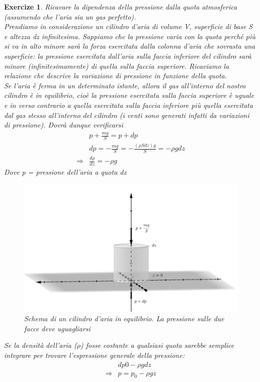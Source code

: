 \documentclass[10pt,a4paper]{article}
\newtheorem{exercize}{Exercize}
\begin{document}
\begin{exercize}
Ricavare la dipendenza della pressione dalla quota atmosferica (assumendo che l’aria sia un gas perfetto).\\
Prendiamo in considerazione un cilindro d'aria di volume V, superficie di base S e altezza dz infinitesima. Sappiamo che la pressione varia con la quota perché più si va in alto minore sarà la forza esercitata dalla colonna d'aria che sovrasta una superficie: la pressione esercitata dall'aria sulla faccia inferiore del cilindro sarà minore (infinitesimamente) di quella sulla faccia superiore. Ricaviamo la relazione che descrive la variazione di pressione in funzione della quota.\\
Se l'aria è ferma in un determinato istante, allora il gas all'interno del nostro cilindro è in equilibrio, cioè la pressione esercitata sulla faccia superiore è uguale e in verso contrario a quella esercitata sulla faccia inferiore più quella esercitata dal gas stesso all'interno del cilindro (i venti sono generati infatti da variazioni di pressione). Dovrà dunque verificarsi
\begin{align}\label{eq:stevin}
	&p + \frac{m g}{S} = p + dp \nonumber \\
	&dp = -\frac{m g}{S} = -\frac{(\rho S dz) g}{S}= -\rho g dz \nonumber \\
	\Rightarrow & \frac{d\rho}{dz}= - \rho g
\end{align}
Dove p = pressione dell'aria a quota dz
\begin{figure}[h!]
	\centering
	\includegraphics[width=0.5\linewidth]{cilindro_aria}
	\caption{Schema di un cilindro d'aria in equilibrio. La pressione sulle due facce deve uguagliarsi}
	\label{fig:cilindroaria}
\end{figure}
\FloatBarrier
Se la densità dell'aria ($\rho$) fosse costante a qualsiasi quota sarebbe semplice integrare per trovare l'espressione generale della pressione:
\begin{align*}
	&dp 0 -\rho  g dz \\
	\Rightarrow & p = p_0 - \rho g z
\end{align*}

\end{exercize}
\end{document}
